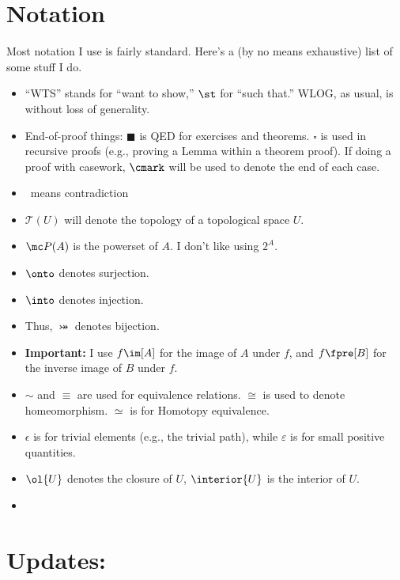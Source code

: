 \documentclass{fkbook}
\begin{document}
\section*{Notation}
Most notation I use is fairly standard. Here's a (by no means exhaustive) list
of some stuff I do.
\begin{itemize}
  \item ``WTS'' stands for ``want to show,'' $\st$ for ``such that.'' WLOG, as
    usual, is without loss of generality.
  \item End-of-proof things: $\blacksquare$ is QED for exercises and theorems.
    $\square$ is used in recursive proofs (e.g., proving a Lemma within a
    theorem proof). If doing a proof with casework, $\cmark$ will be used to
    denote the end of each case.
  \item \contra\ means contradiction
  \item $\mathscr{T}(U)$ will denote the topology of a topological space $U$.
  \item $\mc P(A)$ is the powerset of $A$. I don't like using $2^A$.
  \item $\onto$ denotes surjection.
  \item $\into$ denotes injection.
  \item Thus, $\bij$ denotes bijection.
  \item \textbf{Important:} I use $f\im[A]$ for the image of $A$ under $f$, and
    $f\fpre[B]$ for the inverse image of $B$ under $f$.
  \item $\sim$ and $\equiv$ are used for equivalence relations. $\cong$ is used
    to denote homeomorphism. $\simeq$ is for Homotopy equivalence.
  \item $\epsilon$ is for trivial elements (e.g., the trivial path), while
    $\varepsilon$ is for small positive quantities.
  \item $\ol{U}$ denotes the closure of $U$, $\interior{U}$ is the interior of
    $U$.
  \item
\end{itemize}

\section*{Updates:}
\end{document}
